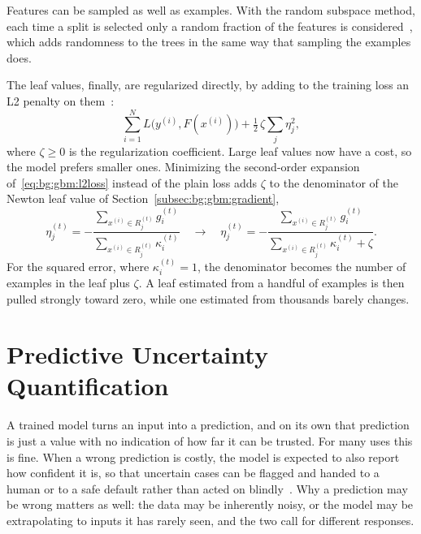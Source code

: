     Features can be sampled as well as examples. With the random subspace method,
    each time a split is selected only a random fraction of the features is
    considered~\cite{catboostdocs}, which adds randomness to the trees in the same
    way that sampling the examples does.

    The leaf values, finally, are regularized directly, by adding to the training
    loss an L2 penalty on them~\cite{chen2016}:
    \begin{equation}
    \sum_{i=1}^{N} L\bigl(y^{(i)}, F(x^{(i)})\bigr)
    + \tfrac{1}{2}\, \zeta \sum_{j} \eta_j^{2},
    \label{eq:bg:gbm:l2loss}
    \end{equation}
    where $\zeta \ge 0$ is the regularization coefficient. Large leaf values now
    have a cost, so the model prefers smaller ones. Minimizing the second-order
    expansion of~\eqref{eq:bg:gbm:l2loss} instead of the plain loss adds $\zeta$
    to the denominator of the Newton leaf value of
    Section~\ref{subsec:bg:gbm:gradient},
    \begin{equation}
    \eta_j^{(t)} =
    -\frac{\sum_{x^{(i)} \in R_j^{(t)}} g_i^{(t)}}
        {\sum_{x^{(i)} \in R_j^{(t)}} \kappa_i^{(t)}}
    \quad \longrightarrow \quad
    \eta_j^{(t)} =
    -\frac{\sum_{x^{(i)} \in R_j^{(t)}} g_i^{(t)}}
        {\sum_{x^{(i)} \in R_j^{(t)}} \kappa_i^{(t)} + \zeta}.
    \label{eq:bg:gbm:l2leaf}
    \end{equation}
    For the squared error, where $\kappa_i^{(t)} = 1$, the denominator becomes the
    number of examples in the leaf plus $\zeta$. A leaf estimated from a handful
    of examples is then pulled strongly toward zero, while one estimated from
    thousands barely changes.


\section{Predictive Uncertainty Quantification}
\label{sec:bg:uncertainty}
A trained model turns an input into a prediction, and on its own that
prediction is just a value with no indication of how far it can be trusted.
For many uses this is fine. When a wrong prediction is costly, the model is
expected to also report how confident it is, so that uncertain cases can be
flagged and handed to a human or to a safe default rather than acted on
blindly~\cite{malinin2021}. Why a prediction may be wrong matters as well:
the data may be inherently noisy, or the model may be extrapolating to inputs
it has rarely seen, and the two call for different responses.

